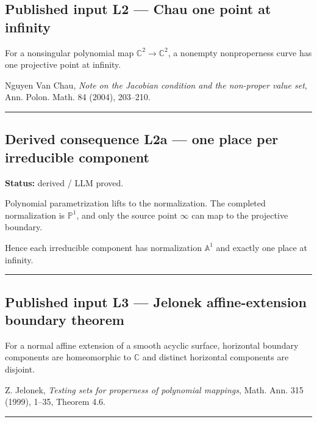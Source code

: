 \subsection{Published input L2 --- Chau one point at
infinity}\label{published-input-l2-chau-one-point-at-infinity}

For a nonsingular polynomial map \(\mathbb C^2\to\mathbb C^2\), a
nonempty nonproperness curve has one projective point at infinity.

Nguyen Van Chau, \emph{Note on the Jacobian condition and the non-proper
value set}, Ann. Polon. Math. 84 (2004), 203--210.

\begin{center}\rule{0.5\linewidth}{0.5pt}\end{center}

\subsection{Derived consequence L2a --- one place per irreducible
component}\label{derived-consequence-l2a-one-place-per-irreducible-component}

\textbf{Status:} derived / LLM proved.

Polynomial parametrization lifts to the normalization. The completed
normalization is \(\mathbb P^1\), and only the source point \(\infty\)
can map to the projective boundary.

Hence each irreducible component has normalization \(\mathbb A^1\) and
exactly one place at infinity.

\begin{center}\rule{0.5\linewidth}{0.5pt}\end{center}

\subsection{Published input L3 --- Jelonek affine-extension boundary
theorem}\label{published-input-l3-jelonek-affine-extension-boundary-theorem}

For a normal affine extension of a smooth acyclic surface, horizontal
boundary components are homeomorphic to \(\mathbb C\) and distinct
horizontal components are disjoint.

Z. Jelonek, \emph{Testing sets for properness of polynomial mappings},
Math. Ann. 315 (1999), 1--35, Theorem 4.6.

\begin{center}\rule{0.5\linewidth}{0.5pt}\end{center}

